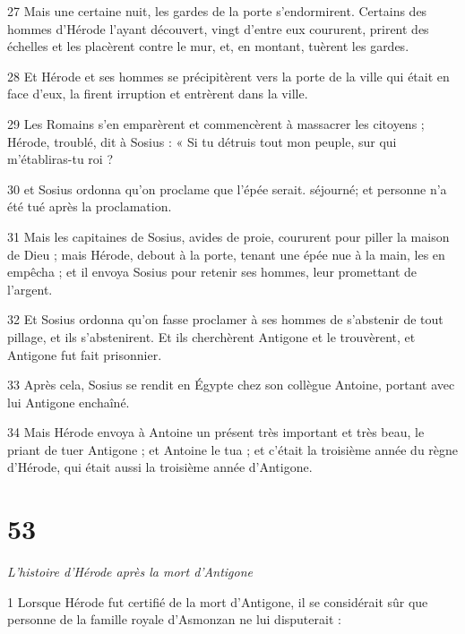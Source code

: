 \par 27 Mais une certaine nuit, les gardes de la porte s'endormirent. Certains des hommes d'Hérode l'ayant découvert, vingt d'entre eux coururent, prirent des échelles et les placèrent contre le mur, et, en montant, tuèrent les gardes.

\par 28 Et Hérode et ses hommes se précipitèrent vers la porte de la ville qui était en face d'eux, la firent irruption et entrèrent dans la ville.

\par 29 Les Romains s'en emparèrent et commencèrent à massacrer les citoyens ; Hérode, troublé, dit à Sosius : « Si tu détruis tout mon peuple, sur qui m'établiras-tu roi ?

\par 30 et Sosius ordonna qu'on proclame que l'épée serait. séjourné; et personne n’a été tué après la proclamation.

\par 31 Mais les capitaines de Sosius, avides de proie, coururent pour piller la maison de Dieu ; mais Hérode, debout à la porte, tenant une épée nue à la main, les en empêcha ; et il envoya Sosius pour retenir ses hommes, leur promettant de l'argent.

\par 32 Et Sosius ordonna qu'on fasse proclamer à ses hommes de s'abstenir de tout pillage, et ils s'abstenirent. Et ils cherchèrent Antigone et le trouvèrent, et Antigone fut fait prisonnier.

\par 33 Après cela, Sosius se rendit en Égypte chez son collègue Antoine, portant avec lui Antigone enchaîné.

\par 34 Mais Hérode envoya à Antoine un présent très important et très beau, le priant de tuer Antigone ; et Antoine le tua ; et c'était la troisième année du règne d'Hérode, qui était aussi la troisième année d'Antigone.

\chapter{53}

\par \textit{L'histoire d'Hérode après la mort d'Antigone}

\par 1 Lorsque Hérode fut certifié de la mort d'Antigone, il se considérait sûr que personne de la famille royale d'Asmonzan ne lui disputerait :

